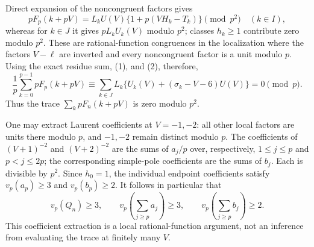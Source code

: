 Direct expansion of the noncongruent factors gives
\[
 pF_p(k+pV)=L_kU(V)\{1+p(VH_k-T_k)\}\pmod{p^2}
 \quad(k\in I),
\]
whereas for $k\in J$ it gives $pL_kU_k(V)$ modulo $p^2$; classes
$h_k\geq1$ contribute zero modulo $p^2$.  These are rational-function
congruences in the localization where the factors $V-\ell$ are inverted
and every noncongruent factor is a unit modulo $p$.
Using the exact residue sum, (1), and (2), therefore,
\[
 \frac1p\sum_{k=0}^{p-1}pF_p(k+pV)
 \equiv\sum_{k\in J}L_k\{U_k(V)+(\sigma_k-V-6)U(V)\}=0\pmod p.
\]
Thus the trace $\sum_k pF_n(k+pV)$ is zero modulo $p^2$.

One may extract Laurent coefficients at $V=-1,-2$: all other local
factors are units there modulo $p$, and $-1,-2$ remain distinct modulo
$p$.  The coefficients of $(V+1)^{-2}$ and $(V+2)^{-2}$ are the sums
of $a_j/p$ over, respectively, $1\leq j\leq p$ and $p<j\leq2p$;
the corresponding simple-pole coefficients are the sums of $b_j$.
Each is divisible by $p^2$.  Since $h_0=1$, the individual endpoint
coefficients satisfy $v_p(a_p)\geq3$ and $v_p(b_p)\geq2$.
It follows in particular that
\[
 v_p(Q_n)\geq3,\qquad
 v_p\!\left(\sum_{j\geq p}a_j\right)\geq3,\qquad
 v_p\!\left(\sum_{j\geq p}b_j\right)\geq2.
\]
This coefficient extraction is a local rational-function argument,
not an inference from evaluating the trace at finitely many $V$.
